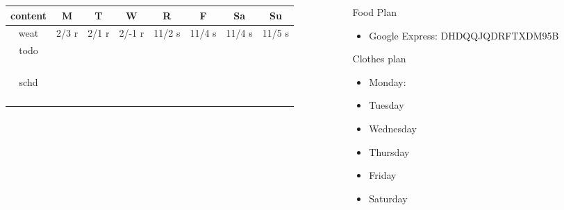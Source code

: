 \begin{columns}
\begin{column}{0.5\linewidth}
\begin{table}[ht!]
\label{fig:calendar}
\begin{center}
\begin{tabular}
{ | c || c | c | c | c | c | c | c |}
\hline
  \textbf{\small content} & {\small \bf M} & {\small \bf T} & {\small
    \bf W} & {\small \bf R} & {\small \bf F} & {\small \bf Sa} &
         {\small \bf Su} \\
  \hline
  \small weat  &\tiny 2/3 r &\tiny 2/1 r &\tiny 2/-1 r &\tiny 11/2 s  &\tiny 11/4 s   &\tiny  11/4 s &\tiny 11/5 s \\
  \hline
  \small todo  &\small &\small &\small &\small &\small &\small
  &\small  \\
  \small       &\small &\small &\small &\small &\small &\small
  &\small  \\
  \small       &\small &\small &\small &\small &\small &\small
  &\small  \\
  \small       &\small &\small &\small &\small &\small &\small
  &\small  \\
  \small       &\small &\small &\small &\small &\small &\small
  &\small  \\
  \hline
  \small schd  &\small &\small &\small &\small &\small &\small &\small  \\
  \small     &\small &\small &\small &\small &\small &\small  &\small
  \\
  \small      &\small &\small &\small &\small &\small &\small  &\small
  \\
  \small    &\small &\small &\small &\small &\small &\small  &\small
  \\
  \small     &\small &\small &\small &\small &\small &\small &\small
  \\
  \hline
\end{tabular}
\end{center}
\end{table}

\end{column}
    
    \begin{column}{0.25\linewidth}
      \begin{block}{Food Plan} 
        \begin{itemize}
          \tiny \item \tiny Google Express: DHDQQJQDRFTXDM95B
        \end{itemize}
      \end{block} 
      \begin{block}{Clothes plan} 
        \begin{itemize}
          \tiny \item \tiny Monday: 
        \item \tiny Tuesday
        \item \tiny Wednesday
        \item \tiny Thursday
        \item \tiny Friday
        \item \tiny Saturday
        \end{itemize} 
      \end{block} 
      

\end{column}
\end{columns}
